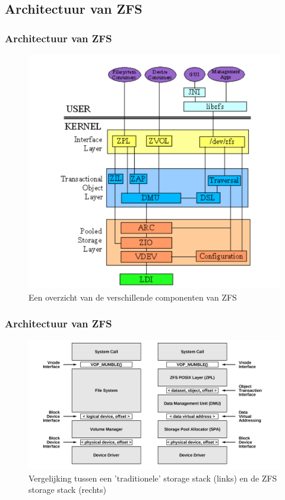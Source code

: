 \documentclass{beamer}
\begin{document}

\subsection{Architectuur van ZFS}


\begin{frame}
\frametitle{Architectuur van ZFS}
  \begin{figure}
    \centering
    \includegraphics[width=0.63\linewidth]{img/h3-zfs_overview}
    \caption{Een overzicht van de verschillende componenten van ZFS \autocite{KendiOnbekend}}
    \label{fig:kendi_zfs_overview}
  \end{figure}
\end{frame}

\begin{frame}
  \frametitle{Architectuur van ZFS}
  \begin{figure}
    \centering
    \includegraphics[width=\linewidth]{img/bs-vs-zfs}
    \caption{Vergelijking tussen een 'traditionele' storage stack (links) en de ZFS storage stack (rechts) \autocite{ZFSBonwick}}
    \label{fig:bonwick_zfs_vs_fs}
  \end{figure}
\end{frame}
\end{document}
